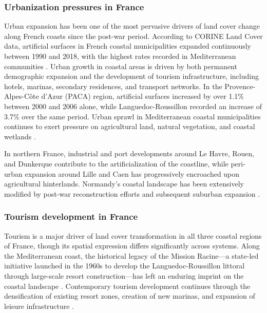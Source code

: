 \documentclass[coasts,article,submit,pdftex,moreauthors]{Definitions/mdpi}
\begin{document}
\subsubsection{Urbanization pressures in France}

Urban expansion has been one of the most pervasive drivers of land cover change along French coasts since the post-war period. According to CORINE Land Cover data, artificial surfaces in French coastal municipalities expanded continuously between 1990 and 2018, with the highest rates recorded in Mediterranean communities \citep{EEA_CLC2018,Perrin2016}. Urban growth in coastal areas is driven by both permanent demographic expansion and the development of tourism infrastructure, including hotels, marinas, secondary residences, and transport networks. In the Provence-Alpes-C\^ote d'Azur (PACA) region, artificial surfaces increased by over 1.1\% between 2000 and 2006 alone, while Languedoc-Roussillon recorded an increase of 3.7\% over the same period. Urban sprawl in Mediterranean coastal municipalities continues to exert pressure on agricultural land, natural vegetation, and coastal wetlands \citep{Salvati2014}.

In northern France, industrial and port developments around Le Havre, Rouen, and Dunkerque contribute to the artificialization of the coastline, while peri-urban expansion around Lille and Caen has progressively encroached upon agricultural hinterlands. Normandy's coastal landscape has been extensively modified by post-war reconstruction efforts and subsequent suburban expansion \citep{Burak2004}.

\subsubsection{Tourism development in France}

Tourism is a major driver of land cover transformation in all three coastal regions of France, though its spatial expression differs significantly across systems. Along the Mediterranean coast, the historical legacy of the Mission Racine—a state-led initiative launched in the 1960s to develop the Languedoc-Roussillon littoral through large-scale resort construction—has left an enduring imprint on the coastal landscape \citep{Vlassi2019a,Vlassi2019b}. Contemporary tourism development continues through the densification of existing resort zones, creation of new marinas, and expansion of leisure infrastructure \citep{hatt2020amenagement,bernard2016nautisme}.
\end{document}
